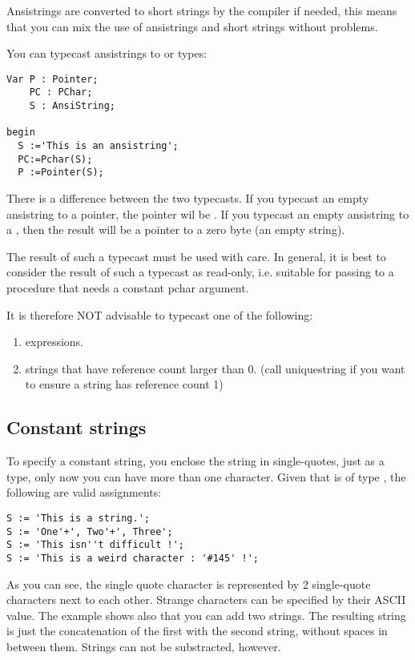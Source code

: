 \documentclass{report}
\begin{document}
Ansistrings are converted to short strings by the compiler if needed,
this means that you can mix the use of ansistrings and short strings
without problems.

You can typecast ansistrings to  or  types:
\begin{verbatim}
Var P : Pointer;
    PC : PChar;
    S : AnsiString;

begin
  S :='This is an ansistring';
  PC:=Pchar(S);
  P :=Pointer(S);
\end{verbatim}
There is a difference between the two typecasts. If you typecast an empty
ansistring to a pointer, the pointer wil be . If you typecast an 
empty ansistring to a , then the result will be a pointer to a 
zero byte (an empty string).

The result of such a typecast must be used with care. In general, it is best
to consider the result of such a typecast as read-only, i.e. suitable for
passing to a procedure that needs a constant pchar argument.

It is therefore NOT advisable to typecast one of the following:
\begin{enumerate}
\item expressions.
\item strings that have reference count larger than 0.  
(call uniquestring if you want to ensure a string has reference count 1)
\end{enumerate}
\subsection{Constant strings}

To specify a constant string, you enclose the string in single-quotes, just
as a  type, only now you can have more than one character.
Given that  is of type , the following are valid assignments:
\begin{verbatim}
S := 'This is a string.';
S := 'One'+', Two'+', Three';
S := 'This isn''t difficult !';
S := 'This is a weird character : '#145' !';
\end{verbatim}
As you can see, the single quote character is represented by 2 single-quote
characters next to each other. Strange characters can be specified by their
ASCII value.
The example shows also that you can add two strings. The resulting string is
just the concatenation of the first with the second string, without spaces in
between them. Strings can not be substracted, however.
\end{document}
